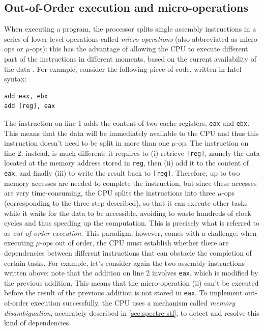 \documentclass[12pt,a4paper]{book}
\theoremstyle{definition}
\begin{document}
	\subsection{Out-of-Order execution and micro-operations}\label{ooo-exec}
	When executing a program, the processor splits single assembly instructions in a series of lower-level operations called \textit{micro-operations} (also abbreviated as micro-ops or $\mu$-ops): this has the advantage of allowing the CPU to execute different part of the instructions in different moments, based on the current availability of the data \cite{Fog2021}. For example, consider the following piece of code, written in Intel syntax:
	\begin{lstlisting}
add eax, ebx
add [reg], eax
	\end{lstlisting}
	The instruction on line 1 adds the content of two cache registers, \texttt{eax} and \texttt{ebx}. This means that the data will be immediately available to the CPU and thus this instruction doesn't need to be split in more than one $\mu$-op. The instruction on line 2, instead, is much different: it requires to (i) retrieve \texttt{[reg]}, namely the data located at the memory address stored in \texttt{reg}, then (ii) add it to the content of \texttt{eax}, and finally (iii) to write the result back to \texttt{[reg]}. Therefore, up to two memory accesses are needed to complete the instruction, but since these accesses are very time-consuming, the CPU splits the instructions into three $\mu$-ops (corresponding to the three step described), so that it can execute other tasks while it waits for the data to be accessible, avoiding to waste hundreds of clock cycles and thus speeding up the computation. This is precisely what is referred to as \textit{out-of-order execution}. This paradigm, however, comes with a challenge: when executing $\mu$-ops out of order, the CPU must establish whether there are dependencies between different instructions that can obstacle the completion of certain tasks.	For example, let's consider again the two assembly instructions written above: note that the addition on line 2 involves \texttt{eax}, which is modified by the previous addition. This means that the micro-operation (ii) can't be executed before the result of the previous addition is not stored in \texttt{eax}. To implement out-of-order execution successfully, the CPU uses a mechanism called \textit{memory disambiguation}, accurately described in \ref{sec:spectre-stl}, to detect and resolve this kind of dependencies. 
	
\end{document}
